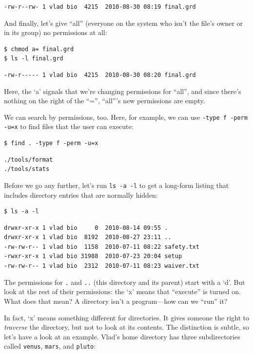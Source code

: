 \documentclass{book}
\begin{document}
\begin{verbatim}
-rw-r--rw- 1 vlad bio  4215  2010-08-30 08:19 final.grd
\end{verbatim}

And finally, let's give ``all'' (everyone on the system who isn't the
file's owner or in its group) no permissions at all:

\begin{verbatim}
$ chmod a= final.grd
$ ls -l final.grd
\end{verbatim}

\begin{verbatim}
-rw-r----- 1 vlad bio  4215  2010-08-30 08:20 final.grd
\end{verbatim}

Here, the `a' signals that we're changing permissions for ``all'', and
since there's nothing on the right of the ``='', ``all'''s new
permissions are empty.

We can search by permissions, too. Here, for example, we can use
\texttt{-type f -perm -u=x} to find files that the user can execute:

\begin{verbatim}
$ find . -type f -perm -u=x
\end{verbatim}

\begin{verbatim}
./tools/format
./tools/stats
\end{verbatim}

Before we go any further, let's run \texttt{ls -a -l} to get a long-form
listing that includes directory entries that are normally hidden:

\begin{verbatim}
$ ls -a -l
\end{verbatim}

\begin{verbatim}
drwxr-xr-x 1 vlad bio     0  2010-08-14 09:55 .
drwxr-xr-x 1 vlad bio  8192  2010-08-27 23:11 ..
-rw-rw-r-- 1 vlad bio  1158  2010-07-11 08:22 safety.txt
-rwxr-xr-x 1 vlad bio 31988  2010-07-23 20:04 setup
-rw-rw-r-- 1 vlad bio  2312  2010-07-11 08:23 waiver.txt
\end{verbatim}

The permissions for \texttt{.} and \texttt{..} (this directory and its
parent) start with a `d'. But look at the rest of their permissions: the
`x' means that ``execute'' is turned on. What does that mean? A
directory isn't a program---how can we ``run'' it?

In fact, `x' means something different for directories. It gives someone
the right to \emph{traverse} the directory, but not to look at its
contents. The distinction is subtle, so let's have a look at an example.
Vlad's home directory has three subdirectories called \texttt{venus},
\texttt{mars}, and \texttt{pluto}:
\end{document}
